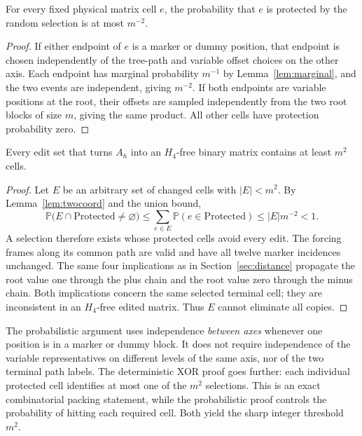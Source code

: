 \begin{lemma}\label{lem:twocoord}
For every fixed physical matrix cell $e$, the probability that $e$
is protected by the random selection is at most $m^{-2}$.
\end{lemma}
\begin{proof}
If either endpoint of $e$ is a marker or dummy position, that
endpoint is chosen independently of the tree-path and variable
offset choices on the other axis. Each endpoint has marginal
probability $m^{-1}$ by Lemma~\ref{lem:marginal}, and the two
events are independent, giving $m^{-2}$. If both endpoints are
variable positions at the root, their offsets are sampled
independently from the two root blocks of size $m$, giving the
same product. All other cells have protection probability zero.
\end{proof}

\begin{proposition}
\label{prop:problower}
Every edit set that turns $A_h$ into an $H_4$-free binary matrix
contains at least $m^2$ cells.
\end{proposition}
\begin{proof}
Let $E$ be an arbitrary set of changed cells with $|E|<m^2$.
By Lemma~\ref{lem:twocoord} and the union bound,
\[
 \mathbb P\bigl(E\cap\mathrm{Protected}\ne\varnothing\bigr)
 \le \sum_{e\in E}\mathbb P(e\in\mathrm{Protected})
 \le |E|m^{-2}<1.
\]
A selection therefore exists whose protected cells avoid every
edit. The forcing frames along its common path are valid and have
all twelve marker incidences unchanged. The same four implications
as in Section~\ref{sec:distance} propagate the root value one
through the plus chain and the root value zero through the minus
chain. Both implications concern the same selected terminal cell;
they are inconsistent in an $H_4$-free edited matrix. Thus $E$
cannot eliminate all copies.
\end{proof}

The probabilistic argument uses independence \emph{between axes}
whenever one position is in a marker or dummy block. It does not
require independence of the variable representatives on different
levels of the same axis, nor of the two terminal path labels.
The deterministic XOR proof goes further: each individual protected
cell identifies at most one of the $m^2$ selections. This is an exact
combinatorial packing statement, while the probabilistic proof
controls the probability of hitting each required cell. Both yield
the sharp integer threshold $m^2$.

